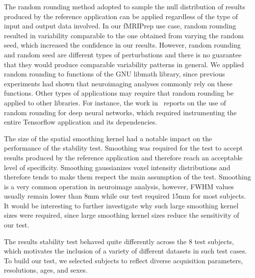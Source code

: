 \documentclass[lettersize,journal]{IEEEtran}
\newcommand{\fmriprep}{fMRIPrep\xspace}
\begin{document}
The random rounding method adopted to sample the null distribution of results produced by the reference application can be applied regardless of the type of input and output data involved. In our \fmriprep use case, random rounding resulted in variability comparable to the one obtained from varying the random seed, which increased the confidence in our results. However, random rounding and random seed are different types of perturbations and there is no guarantee that they would produce comparable variability patterns in general. We applied random rounding to functions of the GNU libmath library, since previous experiments had shown that neuroimaging analyses commonly rely on these functions. Other types of applications may require that random rounding be applied to other libraries. For instance, the work in~\cite{pepe2022numerical} reports on the use of random rounding for deep neural networks, which required instrumenting the entire Tensorflow application and its dependencies.

The size of the spatial smoothing kernel had a notable impact on the performance of the stability test. Smoothing was required for the test to accept results produced by the reference application and therefore reach an acceptable level of specificity. Smoothing gaussianizes voxel intensity distributions and therefore tends to make them respect the main assumption of the test. Smoothing is a very common operation in neuroimage analysis, however, FWHM values usually remain lower than 8mm while our test required 15mm for most subjects. It would be interesting to further investigate why such large smoothing kernel sizes were required, since large smoothing kernel sizes reduce the sensitivity of our test. 

The results stability test behaved quite differently across the 8 test subjects, which motivates the inclusion 
of a variety of different datasets in such test cases. To build our test, we selected subjects to reflect diverse acquisition parameters, resolutions, ages, and sexes.
\end{document}
